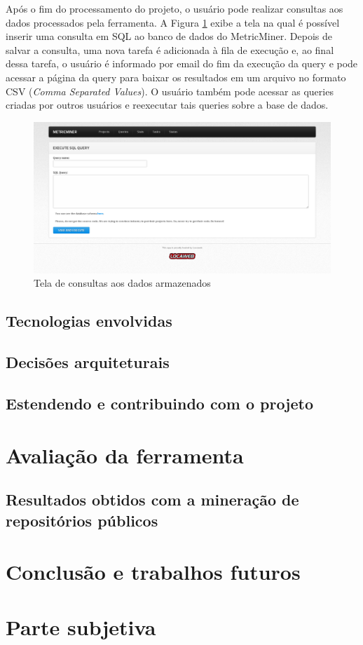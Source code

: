 \documentclass[a4paper, 12pt, twoside]{book}
\begin{document}
        Após o fim do processamento do projeto, o usuário pode realizar consultas aos dados processados pela ferramenta. A Figura \ref{fig:screen_query} exibe a tela na qual é possível inserir uma consulta em SQL ao banco de dados do MetricMiner. Depois de salvar a consulta, uma nova tarefa é adicionada à fila de execução e, ao final dessa tarefa, o usuário é informado por email do fim da execução da query e pode acessar a página da query para baixar os resultados em um arquivo no formato CSV (\textit{Comma Separated Values}). O usuário também pode acessar as queries criadas por outros usuários e reexecutar tais queries sobre a base de dados.

        \begin{figure}[ht]
            \centering
            \includegraphics[width=1.00\textwidth]{img/query.png}
            \caption{Tela de consultas aos dados armazenados}
            \label{fig:screen_query}
        \end{figure}

    \section{Tecnologias envolvidas} \label{sc:tecnologias}
    
    \section{Decisões arquiteturais} \label{sc:arquitetura}
    
    \section{Estendendo e contribuindo com o projeto}
    
\chapter{Avaliação da ferramenta} \label{ch:avaliacao}

    \section{Resultados obtidos com a mineração de repositórios públicos}

\chapter{Conclusão e trabalhos futuros} \label{ch:conclusao}

\chapter{Parte subjetiva} \label{ch:subjetiva}



\end{document}
